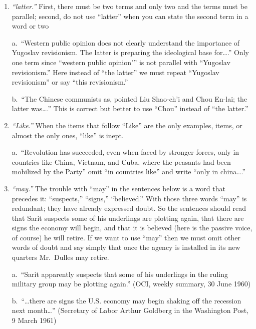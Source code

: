 \documentclass[
    oneside,
    11pt,
]{memoir}
\begin{document}
\begin{enumerate}
  \item \emph{\enquote{latter.}} First, there must be two terms and only two and the terms must be parallel; second, do not use \enquote{latter} when you can state the second term in a word or two 
  
  a.\ \enquote{Western public opinion does not clearly understand the importance of Yugoslav revisionism. The latter is preparing the ideological base for\dots.}  Only one term since \enquote{western public opinion'} is not parallel with \enquote{Yugoslav revisionism.} Here instead of \enquote{the latter} we must repeat \enquote{Yugoslav revisionism} or say \enquote{this revisionism.} 
  
  b.\ \enquote{The Chinese communists as, pointed Liu Shao-ch'i and Chou En-lai; the latter was\dots.} This is correct but better to use \enquote{Chou} instead of \enquote{the latter.} 
  
  \item \emph{\enquote{Like.}} When the items that follow \enquote{Like} are the only examples, items, or almost the only ones, \enquote{like} is inept. 
  
  a.\ \enquote{Revolution has succeeded, even when faced by stronger forces, only in countries like China, Vietnam, and Cuba, where the peasants had been mobilized by the Party} omit \enquote{in countries like} and write \enquote{only in china\dots.} 
  
  \item \emph{\enquote{may.}} The trouble with \enquote{may} in the sentences below is a word that precedes it: \enquote{suspects,} \enquote{signs,} \enquote{believed.} With those three words \enquote{may} is redundant; they have already expressed doubt. So the sentences should read that Sarit suspects some of his underlings are plotting again, that there are signs the economy will begin, and that it is believed (here is the passive voice, of course) he will retire. If we want to use \enquote{may} then we must omit other words of doubt and say simply that once the agency is installed in its new quarters Mr.\ Dulles may retire.
  
  a.\ \enquote{Sarit apparently suspects that some of his underlings in the ruling military group may be plotting again.} (OCI, weekly summary, 30 June 1960) 
  
  b.\ \enquote{\dots there are signs the U.S. economy may begin shaking off the recession next month\dots} (Secretary of Labor Arthur Goldberg in the Washington Post, 9 March 1961) 
  

\end{enumerate}
\end{document}
